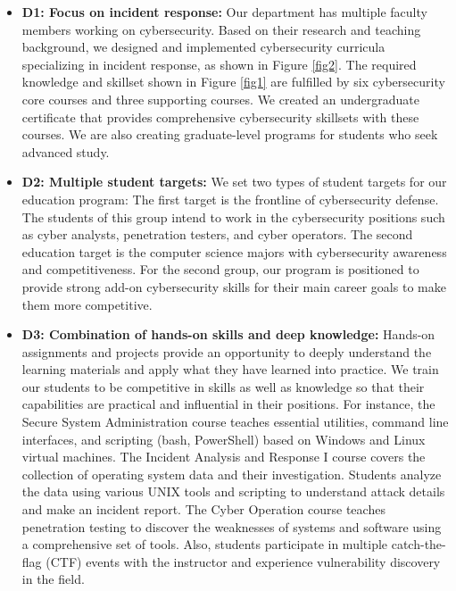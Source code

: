 \documentclass{article}
\begin{document}
\begin{itemize}

\item \textbf{D1: Focus on incident response:} Our department has multiple faculty members working on cybersecurity. Based on their research and teaching background, we designed and implemented cybersecurity curricula specializing in incident response, as shown in Figure \ref{fig2}. The required knowledge and skillset shown in Figure \ref{fig1} are fulfilled by six cybersecurity core courses and three supporting courses. We created an undergraduate certificate that provides comprehensive cybersecurity skillsets with these courses. We are also creating graduate-level programs for students who seek advanced study.

\item \textbf{D2: Multiple student targets:} We set two types of student targets for our education program: The first target is the frontline of cybersecurity defense. The students of this group intend to work in the cybersecurity positions such as cyber analysts, penetration testers, and cyber operators. The second education target is the computer science majors with cybersecurity awareness and competitiveness.  For the second group, our program is positioned to provide strong add-on cybersecurity skills for their main career goals to make them more competitive.      

\item \textbf{D3: Combination of hands-on skills and deep knowledge:} Hands-on assignments and projects provide an opportunity to deeply understand the learning materials and apply what they have learned into practice. We train our students to be competitive in skills as well as knowledge so that their capabilities are practical and influential in their positions. 
%
For instance, the Secure System Administration course teaches essential utilities, command line interfaces, and scripting (bash, PowerShell) based on Windows and Linux virtual machines. The Incident Analysis and Response I course covers the collection of operating system data and their investigation. Students analyze the data using various UNIX tools and scripting to understand attack details and make an incident report. The Cyber Operation course teaches penetration testing to discover the weaknesses of systems and software using a comprehensive set of tools. Also, students participate in multiple catch-the-flag (CTF) events  with the instructor and experience vulnerability discovery in the field.


\end{itemize}
\end{document}
